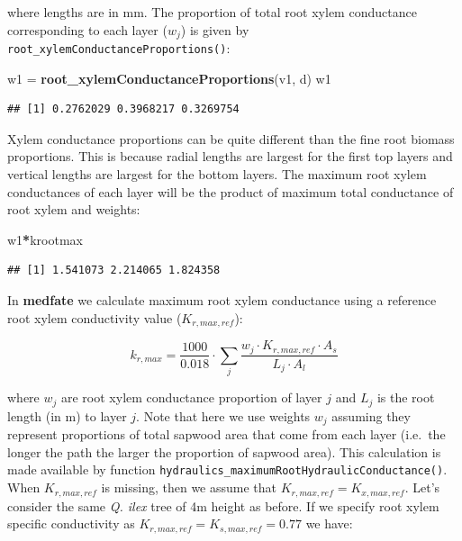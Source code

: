 \documentclass[]{book}
\newenvironment{Shaded}{\begin{snugshade}}{\end{snugshade}}
\newcommand{\KeywordTok}[1]{\textcolor[rgb]{0.13,0.29,0.53}{\textbf{#1}}}
\newcommand{\StringTok}[1]{\textcolor[rgb]{0.31,0.60,0.02}{#1}}
\newcommand{\OperatorTok}[1]{\textcolor[rgb]{0.81,0.36,0.00}{\textbf{#1}}}
\newcommand{\NormalTok}[1]{#1}
\begin{document}
where lengths are in mm. The proportion of total root xylem conductance
corresponding to each layer (\(w_j\)) is given by
\texttt{root\_xylemConductanceProportions()}:

\begin{Shaded}
\begin{Highlighting}[]
\NormalTok{w1 =}\StringTok{ }\KeywordTok{root_xylemConductanceProportions}\NormalTok{(v1, d)}
\NormalTok{w1}
\end{Highlighting}
\end{Shaded}

\begin{verbatim}
## [1] 0.2762029 0.3968217 0.3269754
\end{verbatim}

Xylem conductance proportions can be quite different than the fine root
biomass proportions. This is because radial lengths are largest for the
first top layers and vertical lengths are largest for the bottom layers.
The maximum root xylem conductances of each layer will be the product of
maximum total conductance of root xylem and weights:

\begin{Shaded}
\begin{Highlighting}[]
\NormalTok{w1}\OperatorTok{*}\NormalTok{krootmax}
\end{Highlighting}
\end{Shaded}

\begin{verbatim}
## [1] 1.541073 2.214065 1.824358
\end{verbatim}

In \textbf{medfate} we calculate maximum root xylem conductance using a
reference root xylem conductivity value (\(K_{r,max,ref}\)):

\begin{equation}
k_{r,max}=\frac{1000}{0.018} \cdot \sum_{j}{\frac{w_j \cdot K_{r,max,ref}\cdot A_{s}}{L_j\cdot A_{l}}}
\end{equation}

where \(w_j\) are root xylem conductance proportion of layer \(j\) and
\(L_j\) is the root length (in m) to layer \(j\). Note that here we use
weights \(w_j\) assuming they represent proportions of total sapwood
area that come from each layer (i.e.~the longer the path the larger the
proportion of sapwood area). This calculation is made available by
function \texttt{hydraulics\_maximumRootHydraulicConductance()}. When
\(K_{r,max,ref}\) is missing, then we assume that
\(K_{r,max,ref} = K_{x,max,ref}\). Let's consider the same \emph{Q.
ilex} tree of 4m height as before. If we specify root xylem specific
conductivity as \(K_{r,max,ref} = K_{s,max,ref} =0.77\) we have:
\end{document}
